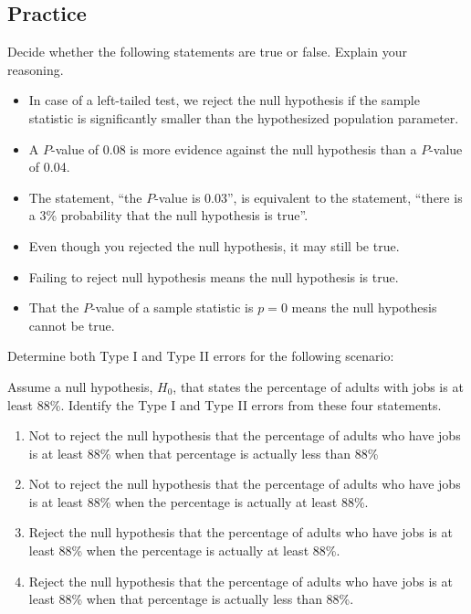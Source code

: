 \hypertarget{practice}{%
\subsection{Practice}\label{practice}}

\begin{exercise}

Decide whether the following statements are true or false. Explain your reasoning.

\begin{itemize}
\item
  In case of a left-tailed test, we reject the null hypothesis if the
  sample statistic is significantly smaller than the hypothesized
  population parameter.
\item
  A \(P\)-value of 0.08 is more evidence against the null hypothesis
  than a \(P\)-value of 0.04.
\item
  The statement, ``the \(P\)-value is 0.03'', is equivalent to the
  statement, ``there is a 3\% probability that the null hypothesis is
  true''.
\item
  Even though you rejected the null hypothesis, it may still be true.
\item
  Failing to reject null hypothesis means the null hypothesis is true.
\item
  That the \(P\)-value of a sample statistic is \(p=0\) means the null
  hypothesis cannot be true.
\end{itemize}

\end{exercise}
\vspace*{4\baselineskip}

\begin{exercise}

Determine both Type I and Type II errors for the following scenario:

Assume a null hypothesis, \(H_0\), that states the percentage of adults
with jobs is at least 88\%. Identify the Type I and Type II errors from
these four statements.

\begin{enumerate}
\item
  Not to reject the null hypothesis that the percentage of adults who
  have jobs is at least 88\% when that percentage is actually less than
  88\%
\item
  Not to reject the null hypothesis that the percentage of adults who
  have jobs is at least 88\% when the percentage is actually at least
  88\%.
\item
  Reject the null hypothesis that the percentage of adults who have jobs
  is at least 88\% when the percentage is actually at least 88\%.
\item
  Reject the null hypothesis that the percentage of adults who have jobs
  is at least 88\% when that percentage is actually less than 88\%.
\end{enumerate}

\end{exercise}
\vspace*{2\baselineskip}

